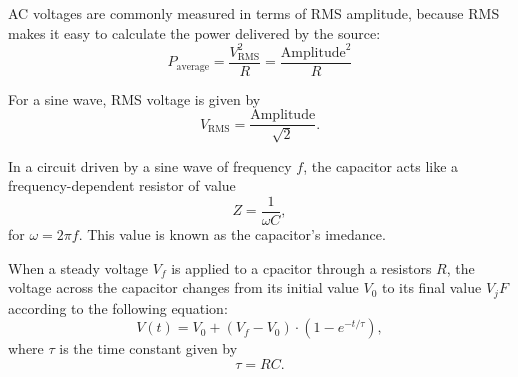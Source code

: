 \documentclass{article}
\begin{document}
\medskip
{}

    AC voltages are commonly measured in terms of RMS amplitude, because RMS makes it easy to calculate the power delivered by the source: $$P_{\text{average}} = \frac{V^2_{\text{RMS}}}{R} = \frac{\text{Amplitude}^2}{R}$$

    For a sine wave, RMS voltage is given by $$V_{\text{RMS}} = \frac{\text{Amplitude}}{\sqrt2}.$$

\medskip
{}

    In a circuit driven by a sine wave of frequency $f$, the capacitor acts like a frequency-dependent resistor of value $$Z = \frac{1}{\omega C},$$
    for $\omega = 2\pi f$. This value is known as the capacitor's imedance.

\medskip
{}

    When a steady voltage $V_f$ is applied to a cpacitor through a resistors $R$, the voltage across the capacitor changes from its initial value $V_0$ to its final value $V_jF$ according to the following equation: $$V(t) = V_0 + (V_f-V_0) \cdot (1 - e^{-t / \tau}),$$ where $\tau$ is the time constant given by $$\tau = RC.$$
\end{document}
